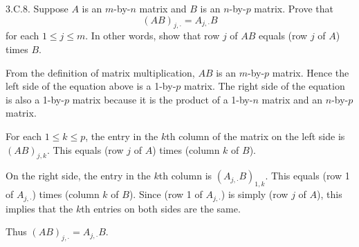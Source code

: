 \documentclass[a5paper]{article}
\begin{document}
\newcommand   \C           {\mathbf{C}}
\newcommand   \R           {\mathbf{R}}
\renewcommand \L           {\mathcal{L}}
\newcommand   \F           {\mathbf{F}}
\renewcommand \P           {\mathcal{P}}
\newcommand   \M           {\mathcal{M}}
\newcommand   \op          {\operatorname}

    3.C.8.
    Suppose $A$ is an $m$-by-$n$ matrix and $B$ is an $n$-by-$p$ matrix.
    Prove that
\begin{equation*}
        (AB)_{j,\cdot} = A_{j,\cdot} B
\end{equation*}
    for each $1 \le j \le m$.
    In other words, show that row $j$ of $AB$ equals (row $j$ of $A$) times $B$.

    From the definition of matrix multiplication, $AB$ is an $m$-by-$p$ matrix.
    Hence the left side of the equation above is a 1-by-$p$ matrix.
    The right side of the equation is also a 1-by-$p$ matrix because it is the product of a 1-by-$n$ matrix and an $n$-by-$p$ matrix.

    For each $1 \le k \le p$, the entry in the $k$th column of the matrix on the left side is $(AB)_{j,k}$.
    This equals (row $j$ of $A$) times (column $k$ of $B$).

    On the right side, the entry in the $k$th column is $(A_{j,\cdot}B)_{1,k}$.
    This equals (row 1 of $A_{j,\cdot}$) times (column $k$ of $B$).
    Since (row 1 of $A_{j,\cdot}$) is simply (row $j$ of $A$), this implies that the $k$th entries on both sides are the same.

    Thus $(AB)_{j,\cdot}=A_{j,\cdot}B$.
\end{document}
